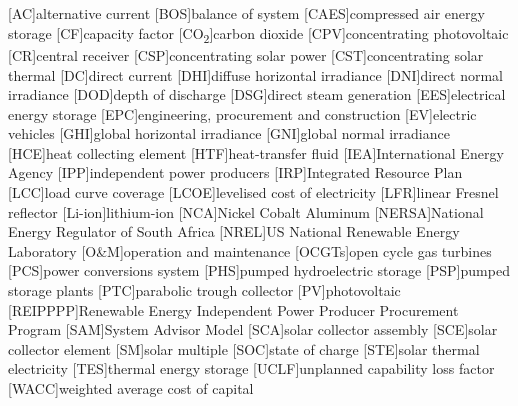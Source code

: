 {}
\chapter*{\listacroname}
\begin{acronym}[XXXXX]
  	[AC]{alternative current}
  	[BOS]{balance of system}
  	[CAES]{compressed air energy storage}
  	[CF]{capacity factor}
  	[CO\textsubscript{2}]{carbon dioxide}
    [CPV]{concentrating photovoltaic}
    [CR]{central receiver}
    [CSP]{concentrating solar power}
    [CST]{concentrating solar thermal} 
    [DC]{direct current}
    [DHI]{diffuse horizontal irradiance}
    [DNI]{direct normal irradiance}
	[DOD]{depth of discharge}
    [DSG]{direct steam generation}
    [EES]{electrical energy storage}
    [EPC]{engineering, procurement and construction}
    [EV]{electric vehicles}
    [GHI]{global horizontal irradiance}
    [GNI]{global normal irradiance}
    [HCE]{heat collecting element}
    [HTF]{heat-transfer fluid} 
    [IEA]{International Energy Agency}
    [IPP]{independent power producers}
    [IRP]{Integrated Resource Plan}
    [LCC]{load curve coverage}
    [LCOE]{levelised cost of electricity}
    [LFR]{linear Fresnel reflector}
    [Li-ion]{lithium-ion}  
    [NCA]{Nickel Cobalt Aluminum}
    [NERSA]{National Energy Regulator of South Africa}
    [NREL]{US National Renewable Energy Laboratory}
    [O\&M]{operation and maintenance}
    [OCGTs]{open cycle gas turbines}
    [PCS]{power conversions system}
    [PHS]{pumped hydroelectric storage}
    [PSP]{pumped storage plants}
    [PTC]{parabolic trough collector}
    [PV]{photovoltaic}
    [REIPPPP]{Renewable Energy Independent Power Producer Procurement Program}
    [SAM]{System Advisor Model}
    [SCA]{solar collector assembly}
    [SCE]{solar collector element}
    [SM]{solar multiple}
    [SOC]{state of charge}
    [STE]{solar thermal electricity}
    [TES]{thermal energy storage}
    [UCLF]{unplanned capability loss factor}
    [WACC]{weighted average cost of capital}
\end{acronym}
